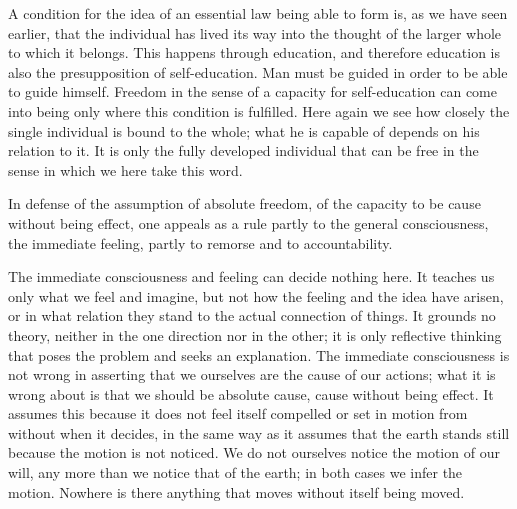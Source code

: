 \documentclass[12pt,a4paper,openany]{book}
\newcommand{\opage}[1]{\marginnote{\footnotesize\textit{[#1]}}}
\begin{document}
A condition for the idea of an essential law being able to form is, as we have
seen earlier, that the individual has lived its way into the thought of the
larger whole to which it belongs. This happens through education, and
therefore education is also the presupposition of self-education. Man must be
guided in order to be able to guide himself. Freedom in the sense of a
capacity for self-education can come into being only where this condition is
fulfilled. Here again we see how closely the single individual is bound to the
whole; what he is capable of depends on his relation to it. It is only the
fully developed individual that can be free in the sense in which we here take
this word.

In defense of the assumption of absolute freedom, of the capacity to be cause
without being effect, one appeals as a rule partly to the general
consciousness, the immediate feeling, partly to remorse and to accountability.

The immediate consciousness and feeling can \opage{123}decide nothing here. It
teaches us only what we feel and imagine, but not how the feeling and the idea
have arisen, or in what relation they stand to the actual connection of
things. It grounds no theory, neither in the one direction nor in the other;
it is only reflective thinking that poses the problem and seeks an
explanation. The immediate consciousness is not wrong in asserting that we
ourselves are the cause of our actions; what it is wrong about is that we
should be absolute cause, cause without being effect. It assumes this because
it does not feel itself compelled or set in motion from without when it
decides, in the same way as it assumes that the earth stands still because the
motion is not noticed. We do not ourselves notice the motion of our will, any
more than we notice that of the earth; in both cases we infer the motion.
Nowhere is there anything that moves without itself being moved.
\end{document}
